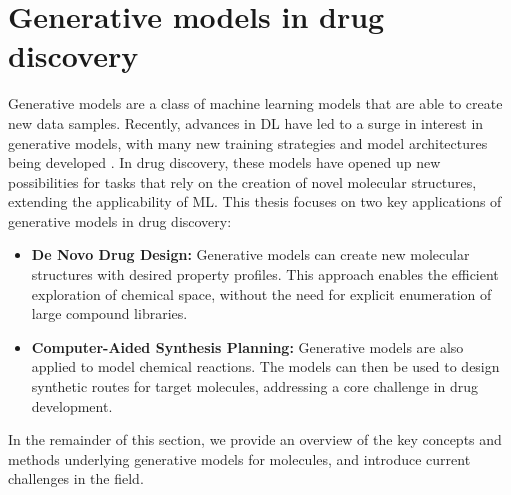 \section{Generative models in drug discovery}
Generative models are a class of machine learning models that are able to create new data samples.
Recently, advances in \ac{DL} have led to a surge in interest in generative models, with many new
training strategies and model architectures being developed
\citep{bond-taylorDeepGenerativeModelling2022,brownLanguageModelsAre2020,goodfellowGenerativeAdversarialNetworks2014,
    dinhDensityEstimationUsing2017,kingmaAutoEncodingVariationalBayes2013,hoDenoisingDiffusionProbabilistic2020,vaswaniAttentionAllYou2017}.
In drug discovery, these models have opened up new possibilities for tasks that rely on the creation
of novel molecular structures, extending the applicability of \ac{ML}. This thesis focuses on two
key applications of generative models in drug discovery:
\begin{itemize}
    \item \textbf{De Novo Drug Design:} Generative models can create new molecular structures with desired property
          profiles. This approach enables the efficient exploration of chemical space, without the need for
          explicit enumeration of large compound libraries.
    \item \textbf{Computer-Aided Synthesis Planning:} Generative models are also applied to model
          chemical reactions. The models can then be used to design synthetic routes for target
          molecules, addressing a core challenge in drug development.
\end{itemize}

In the remainder of this section, we provide an overview of the key concepts and methods underlying
generative models for molecules, and introduce current challenges in the field.

